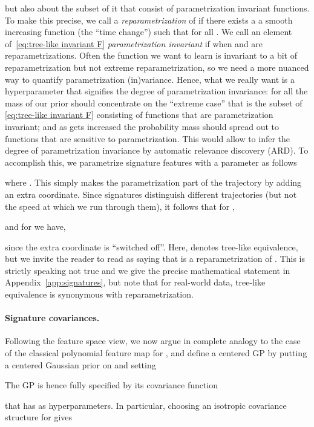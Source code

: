 \documentclass{article}
\begin{document}
but also about the subset of it that consist of parametrization invariant functions. 
To make this precise, we call  a \emph{reparametrization} of  if there exists a a smooth increasing function  (the ``time change'') such that  for all .
We call an element  of~\eqref{eq:tree-like invariant F} \emph{parametrization invariant} if  when  and  are reparametrizations. 
Often the function we want to learn is invariant to a bit of reparametrization but not extreme reparametrization, so we need a more nuanced way to quantify parametrization (in)variance.
Hence, what we really want is a hyperparameter  that signifies the degree of parametrization invariance: for  all the mass of our prior should concentrate on the ``extreme case'' that is the subset of \eqref{eq:tree-like invariant F} consisting of functions that are parametrization invariant; and as  gets increased the probability mass should spread out to functions that are sensitive to parametrization. 
This would allow to infer the degree of parametrization invariance by automatic relevance discovery (ARD). 
To accomplish this, we parametrize signature features with a parameter  as follows

where .
This simply makes the parametrization part of the trajectory  by adding an extra coordinate.
Since signatures distinguish different trajectories (but not the speed at which we run through them), it follows that for ,

and for  we have, 

since the extra coordinate is ``switched off''. 
Here,  denotes tree-like equivalence, but we invite the reader to read  as saying that  is a reparametrization of .
This is strictly speaking not true and we give the precise mathematical statement in Appendix~\ref{app:signatures}, but note that for real-world data, tree-like equivalence is synonymous with reparametrization.

\paragraph{Signature covariances.}
Following the feature space view, we now argue in complete analogy to the case of the classical polynomial feature map  for , and define a centered GP  by putting a centered Gaussian prior on  and setting

The GP is hence fully specified by its covariance function 

that has  as hyperparameters.
In particular, choosing an isotropic covariance structure for  gives
\end{document}
